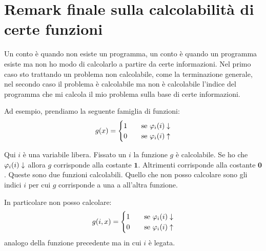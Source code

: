 \section{Remark finale sulla calcolabilità di certe funzioni}

Un conto è quando non esiste un programma, un conto è quando un programma esiste ma
non ho modo di calcolarlo a partire da certe informazioni. Nel primo caso sto trattando un problema
non calcolabile, come la terminazione generale, nel secondo caso il problema è calcolabile ma non è
calcolabile l'indice del programma che mi calcola il mio problema sulla base di certe informazioni.

Ad esempio, prendiamo la seguente famiglia di funzioni:
\begin{equation*}
    g(x) =
    \begin{cases}
        1 \quad &\text{se $\varphi_{i}(i) \downarrow$} \\
        0 \quad &\text{se $\varphi_{i}(i) \uparrow$} \\
    \end{cases}
\end{equation*}

Qui $i$ è una variabile libera. Fissato un $i$ la funzione $g$ è calcolabile. Se ho che $\varphi_{i}(i)
\downarrow$ allora $g$ corrisponde alla costante $\bm{1}$. Altrimenti corrisponde alla costante
$\bm{0}$. Queste sono due funzioni calcolabili. Quello che non posso calcolare sono gli indici $i$
per cui $g$ corrisponde a una a all'altra funzione.

In particolare non posso calcolare:
\begin{equation*}
    g(i,x) =
    \begin{cases}
        1 \quad &\text{se $\varphi_{i}(i) \downarrow$} \\
        0 \quad &\text{se $\varphi_{i}(i) \uparrow$} \\
    \end{cases}
\end{equation*}
analogo della funzione precedente ma in cui $i$ è legata.
